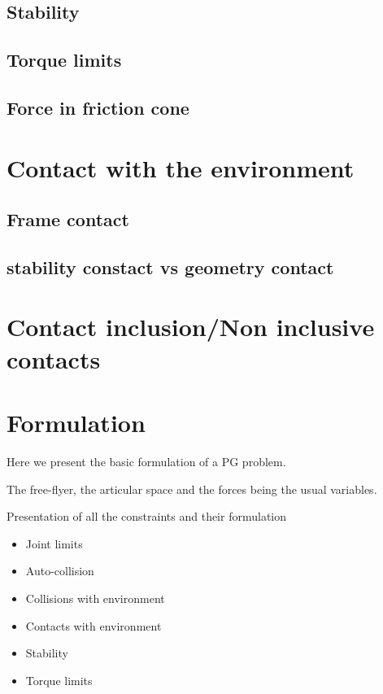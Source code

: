 \subsection{Stability}
\label{sub:stability}

\subsection{Torque limits}
\label{sub:torque_limits}

\subsection{Force in friction cone}
\label{sub:force_in_friction_cone}

\section{Contact with the environment}
\label{sec:contact_with_the_environment}

\subsection{Frame contact}
\label{sub:frame_contact}

\subsection{stability constact vs geometry contact}
\label{sub:stability_constact_vs_geometry_contact}

\section{Contact inclusion/Non inclusive contacts}
\label{sec:contact_inclusion_non_inclusive_contacts}
















\section{Formulation}

Here we present the basic formulation of a PG problem.

The free-flyer, the articular space and the forces being the usual variables.

Presentation of all the constraints and their formulation
\begin{itemize}
  \item Joint limits
  \item Auto-collision
  \item Collisions with environment
  \item Contacts with environment
  \item Stability
  \item Torque limits
\end{itemize}

